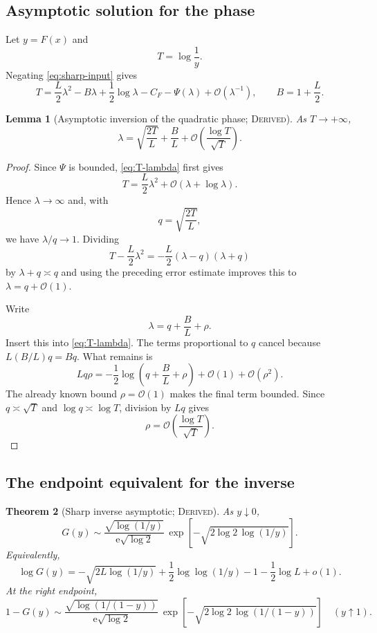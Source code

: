 \documentclass[11pt,oneside]{article}
\newtheorem{theorem}{Theorem}[section]
\newtheorem{lemma}[theorem]{Lemma}
\theoremstyle{definition}
\theoremstyle{remark}
\newcommand{\e}{\mathrm e}
\newcommand{\bigO}{\mathcal O}
\newcommand{\InvF}{G}
\newcommand{\Derived}{\textsc{Derived}}
\begin{document}
\subsection{Asymptotic solution for the phase}

Let $y=F(x)$ and
\[
 T=\log\frac1y.
\]
Negating \eqref{eq:sharp-input} gives
\begin{equation}
 T=\frac L2\lambda^2-B\lambda+\frac12\log\lambda
     -C_F-\Psi(\lambda)+\bigO(\lambda^{-1}),
 \qquad B=1+\frac L2. \label{eq:T-lambda}
\end{equation}

\begin{lemma}[Asymptotic inversion of the quadratic phase; \Derived]
\label{lem:lambda-from-T}
As $T\to+\infty$,
\[
 \lambda
 =\sqrt{\frac{2T}{L}}+\frac BL
   +\bigO\!\left(\frac{\log T}{\sqrt T}\right).
\]
\end{lemma}

\begin{proof}
Since $\Psi$ is bounded, \eqref{eq:T-lambda} first gives
\[
 T=\frac L2\lambda^2+\bigO(\lambda+\log\lambda).
\]
Hence $\lambda\to\infty$ and, with
\[
 q=\sqrt{\frac{2T}{L}},
\]
we have $\lambda/q\to1$.  Dividing
\[
 T-\frac L2\lambda^2
 =-\frac L2(\lambda-q)(\lambda+q)
\]
by $\lambda+q\asymp q$ and using the preceding error estimate improves
this to $\lambda=q+\bigO(1)$.

Write
\[
 \lambda=q+\frac BL+\rho.
\]
Insert this into \eqref{eq:T-lambda}.  The terms proportional to $q$
cancel because $L(B/L)q=Bq$.  What remains is
\[
 Lq\rho
 =-\frac12\log\!\left(q+\frac BL+\rho\right)+\bigO(1)
   +\bigO(\rho^2).
\]
The already known bound $\rho=\bigO(1)$ makes the final term bounded.
Since $q\asymp\sqrt T$ and $\log q\asymp\log T$, division by $Lq$ gives
\[
 \rho=\bigO\!\left(\frac{\log T}{\sqrt T}\right).
\]
\end{proof}

\subsection{The endpoint equivalent for the inverse}

\begin{theorem}[Sharp inverse asymptotic; \Derived]
\label{thm:sharp-inverse-asymptotic}
As $y\downarrow0$,
\begin{equation}
 \boxed{\;
 \InvF(y)\sim
 \frac{\sqrt{\log(1/y)}}{\e\sqrt{\log2}}\,
 \exp\!\left[-\sqrt{2\log2\,\log(1/y)}\right].
 \;} \label{eq:sharp-inverse}
\end{equation}
Equivalently,
\begin{equation}
 \log\InvF(y)
 =-\sqrt{2L\log(1/y)}
  +\frac12\log\log(1/y)
  -1-\frac12\log L+o(1). \label{eq:log-sharp-inverse}
\end{equation}
At the right endpoint,
\begin{equation}
 1-\InvF(y)\sim
 \frac{\sqrt{\log(1/(1-y))}}{\e\sqrt{\log2}}\,
 \exp\!\left[-\sqrt{2\log2\,\log(1/(1-y))}\right]
 \quad(y\uparrow1). \label{eq:right-inverse-asymptotic}
\end{equation}
\end{theorem}
\end{document}
